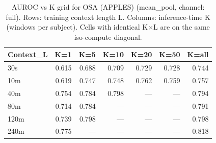 \begin{table}[ht]
\centering
\caption{AUROC vs K grid for OSA (APPLES) (mean_pool, channel: full). Rows: training context length L. Columns: inference-time K (windows per subject). Cells with identical K×L are on the same iso-compute diagonal.}
\label{tab:kgrid_osa_binary_apples_postqc_mean_pool_full}
\begin{tabular}{lrrrrrr}
\toprule
Context_L & K=1 & K=5 & K=10 & K=20 & K=50 & K=all \\
\midrule
30s & 0.615 & 0.688 & 0.709 & 0.729 & 0.728 & 0.744 \\
10m & 0.619 & 0.747 & 0.748 & 0.762 & 0.759 & 0.757 \\
40m & 0.754 & 0.784 & 0.798 & — & — & 0.794 \\
80m & 0.714 & 0.784 & — & — & — & 0.791 \\
120m & 0.739 & 0.798 & — & — & — & 0.798 \\
240m & 0.775 & — & — & — & — & 0.818 \\
\bottomrule
\end{tabular}
\end{table}